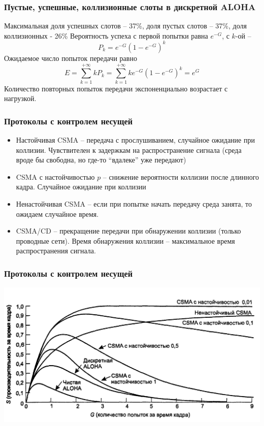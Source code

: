 \documentclass[utf8]{beamer}
\begin{document}
\begin{frame}
\frametitle{Пустые, успешные, коллизионные слоты в дискретной ALOHA}
Максимальная доля успешных слотов -- 37\%, доля пустых слотов -- 37\%, доля коллизионных - 26\%
Вероятность успеха с первой попытки равна $e^{-G}$, с $k$-ой --
$$
P_k = e^{-G} (1 - e^{-G})^k
$$
Ожидаемое число попыток передачи равно
$$
E = \sum_{k=1}^{+\infty}kP_k = \sum_{k=1}^{+\infty}ke^{-G} (1 - e^{-G})^k = e^G
$$
Количество повторных попыток передачи экспоненциально возрастает с нагрузкой.
\end{frame}
\begin{frame}
\frametitle{Протоколы с контролем несущей}
\begin{itemize}
\item Настойчивая CSMA -- передача с прослушиванием, случайное ожидание при коллизии. Чувствителен к задержкам на распространение сигнала (среда вроде бы свободна, но где-то ``вдалеке'' уже передают)
\item CSMA с настойчивостью $p$ -- снижение вероятности коллизии после длинного кадра. Случайное ожидание при коллизии
\item Ненастойчивая CSMA -- если при попытке начать передачу среда занята, то ожидаем случайное время.
\item CSMA/CD -- прекращение передачи при обнаружении коллизии (только проводные сети). Время обнаружения коллизии -- максимальное время распространения сигнала.
\end{itemize}
\end{frame}
\begin{frame}
\frametitle{Протоколы с контролем несущей}
\begin{center}
\includegraphics[width=\textwidth]{pic/csma-perf.png}
\end{center}
\end{frame}
\end{document}
